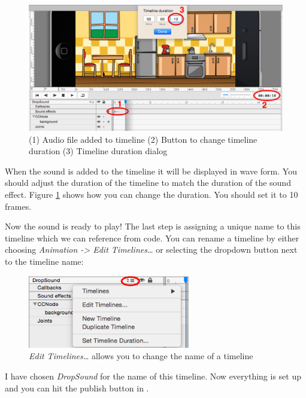 \begin{figure}[H]
		\centering
		\includegraphics[width=0.9\linewidth]{images/Chapter2/audio_timeline.png}
		\caption{(1) Audio file added to timeline\newline{} (2)
		Button to change timeline duration\newline{} (3) Timeline
		duration dialog\newline{}}\label{fig:change_timeline_duration}
\end{figure}

When the sound is added to the timeline it will be displayed in wave form. You
should adjust the duration of the timeline to match the duration of the sound
effect. Figure \ref{fig:change_timeline_duration} shows how you can change the
duration. You should set it to 10 frames.

Now the sound is ready to play! The last step is assigning a unique name to this
timeline which we can reference from code. You can rename a timeline by either
choosing \textit{Animation -> Edit Timelines\ldots} or selecting the dropdown
button next to the timeline name:

\begin{figure}[H]
		\centering
		\includegraphics[width=200pt]{images/Chapter2/edit_timeline.png}
		\caption{\textit{Edit Timelines\ldots} allows you to change the name of a
		timeline}
\end{figure}

I have chosen \textit{DropSound} for the name of this timeline. Now everything
is set up and you can hit the publish button in \SB{}.

